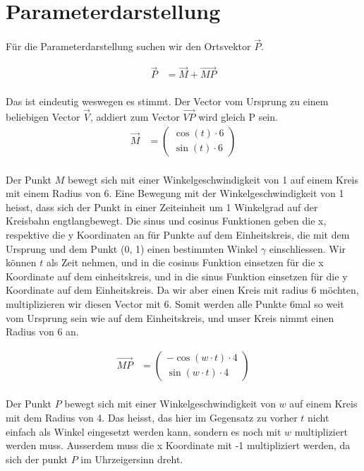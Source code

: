\documentclass[12pt, a4paper, twoside]{article}
\begin{document}
\section{Parameterdarstellung}
Für die Parameterdarstellung suchen wir den Ortsvektor $\vec{P}$.

\begin{align*}
  \overrightarrow{P} & = \overrightarrow{M} + \overrightarrow{MP} \\
\end{align*}

Das ist eindeutig weswegen es stimmt.
Der Vector vom Ursprung zu einem beliebigen Vector $\overrightarrow{V}$, addiert zum Vector $\overrightarrow{VP}$ wird gleich P sein.
\\

\begin{align*}
  \overrightarrow{M} & = \begin{pmatrix}
    \cos(t) \cdot 6
    \\
    \sin(t) \cdot 6
  \end{pmatrix} \\
\end{align*}

Der Punkt $M$ bewegt sich mit einer Winkelgeschwindigkeit von 1 auf einem Kreis mit einem Radius von 6.
Eine Bewegung mit der Winkelgeschwindigkeit von 1 heisst, dass sich der Punkt in einer Zeiteinheit um 1 Winkelgrad auf der Kreisbahn engtlangbewegt.
Die sinus und cosinus Funktionen geben die x, respektive die y Koordinaten an für Punkte auf dem Einheitskreis, die mit dem Ursprung und dem Punkt (0, 1) einen bestimmten Winkel $\gamma$ einschliessen.
Wir können $t$ als Zeit nehmen, und in die cosinus Funktion einsetzen für die x Koordinate auf dem einheitskreis, und in die sinus Funktion einsetzen für die y Koordinate auf dem Einheitskreis.
Da wir aber einen Kreis mit radius 6 möchten, multiplizieren wir diesen Vector mit 6.
Somit werden alle Punkte 6mal so weit vom Ursprung sein wie auf dem Einheitskreis, und unser Kreis nimmt einen Radius von 6 an.

\begin{align*}
  \overrightarrow{MP} & = \begin{pmatrix}
    -\cos(w\cdot t) \cdot 4
    \\
    \sin(w\cdot t) \cdot 4
  \end{pmatrix}
\end{align*}
\\

Der Punkt $P$ bewegt sich mit einer Winkelgeschwindigkeit von $w$ auf einem Kreis mit dem Radius von 4.
Das heisst, das hier im Gegensatz zu vorher $t$ nicht einfach als Winkel eingesetzt werden kann, sondern es noch mit $w$ multipliziert werden muss.
Ausserdem muss die x Koordinate mit -1 multipliziert werden, da sich der punkt $P$ im Uhrzeigersinn dreht.
\end{document}
